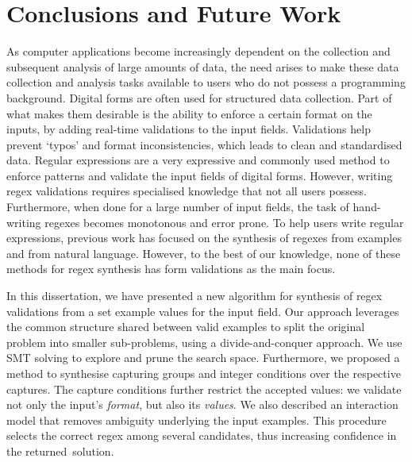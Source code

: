 \vspace*{-.5ex}\chapter{\texorpdfstring{\vspace*{-.9ex}}{}Conclusions and Future Work}
\label{chap:conclusions}
\vspace*{-.5ex}

As computer applications become increasingly dependent on the collection and subsequent analysis of large amounts of data, the need arises to make these data collection and analysis tasks available to users who do not possess a programming background.
Digital forms are often used for structured data collection. Part of what makes them desirable is the ability to enforce a certain format on the inputs, by adding real-time validations to the input fields. Validations help prevent `typos' and format inconsistencies, which leads to clean and standardised data.
Regular expressions are a very expressive and commonly used method to enforce patterns and validate the input fields of digital forms.
However, writing regex validations requires specialised knowledge that not all users possess. Furthermore, when done for a large number of input fields, the task of hand-writing regexes becomes monotonous and error prone. To help users write regular expressions, previous work has focused on the synthesis of regexes from examples and from natural language. However, to the best of our knowledge, none of these methods for regex synthesis has form validations as the main focus.

In this dissertation, we have presented a new algorithm for synthesis of regex validations from a set example values for the input field. Our approach leverages the common structure shared between valid examples to split the original problem into smaller sub-problems, using a divide-and-conquer approach.
We use SMT solving to explore and prune the search space.
%
Furthermore, we proposed a method to synthesise capturing groups and integer conditions over the respective captures. The capture conditions further restrict the accepted values: we validate not only the input's \textit{format}, but also its \textit{values}. We also described an interaction model that removes ambiguity underlying the input examples. This procedure selects the correct regex among several candidates, thus increasing confidence in the returned~solution.

